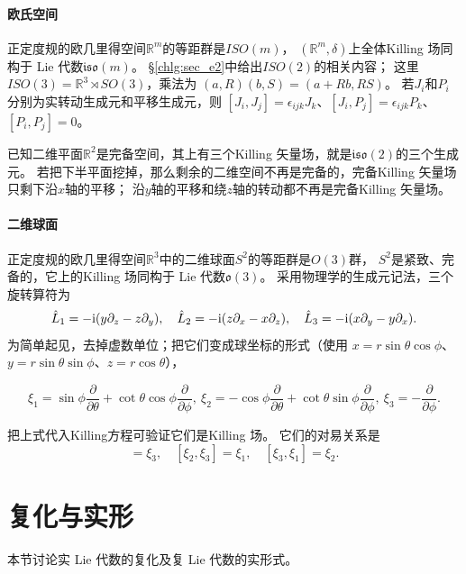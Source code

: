 \paragraph{欧氏空间}
正定度规的欧几里得空间$\mathbb{R}^m$的等距群是$ISO(m)$，
$(\mathbb{R}^m,\delta)$上全体Killing 场同构于 Lie 代数$\mathfrak{iso}(m)$。
\S\ref{chlg:sec_e2}中给出$ISO(2)$的相关内容；
这里$ISO(3)=\mathbb R^3\rtimes SO(3)$，乘法为
$(a,R)(b,S)=(a+Rb,RS)$。
若$J_i$和$P_i$分别为实转动生成元和平移生成元，则
$[J_i,J_j]=\epsilon_{ijk}J_k$、$[J_i,P_j]=\epsilon_{ijk}P_k$、$[P_i,P_j]=0$。

\begin{example}
    已知二维平面$\mathbb{R}^2$是完备空间，其上有三个Killing 矢量场，就是$\mathfrak{iso}(2)$的三个生成元。
    若把下半平面挖掉，那么剩余的二维空间不再是完备的，完备Killing 矢量场只剩下沿$x$轴的平移；
    沿$y$轴的平移和绕$z$轴的转动都不再是完备Killing 矢量场。
\end{example}

\paragraph{二维球面}
正定度规的欧几里得空间$\mathbb{R}^3$中的二维球面$S^2$的等距群是$O(3)$群，
$S^2$是紧致、完备的，它上的Killing 场同构于 Lie 代数$\mathfrak{o}(3)$。
采用物理学的生成元记法，三个旋转算符为
\begin{equation*}
        \hat{L}_1 = -\mathrm{i} (y \partial_z - z \partial_y ), \quad
        \hat{L}_2 = -\mathrm{i} (z \partial_x - x \partial_z ), \quad
        \hat{L}_3 = -\mathrm{i} (x \partial_y - y \partial_x ).
\end{equation*}
为简单起见，去掉虚数单位；把它们变成球坐标的形式（使用 $x=r\sin\theta\cos\phi$、$y=r\sin\theta\sin\phi$、$z=r\cos\theta$），
\begin{small}
\begin{equation}
    \xi_1= \sin\phi \frac{\partial }{\partial \theta} + \cot\theta \cos\phi \frac{\partial }{\partial \phi},\
    \xi_2=-\cos\phi\frac{\partial }{\partial \theta}+\cot\theta\sin\phi \frac{\partial }{\partial \phi},\
    \xi_3=-\frac{\partial }{\partial \phi} .
\end{equation}
\end{small}
把上式代入Killing方程可验证它们是Killing 场。
它们的对易关系是
\begin{equation}
    [\xi_1, \xi_2] = \xi_3, \quad
    [\xi_2, \xi_3] = \xi_1, \quad
    [\xi_3, \xi_1] = \xi_2 .
\end{equation}

\section{复化与实形}
本节讨论实 Lie 代数的复化及复 Lie 代数的实形式。

